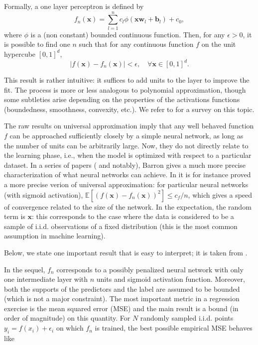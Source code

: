 \documentclass[]{krantz}
\theoremstyle{definition}
\theoremstyle{definition}
\theoremstyle{definition}
\theoremstyle{remark}
\begin{document}
Formally, a one layer perceptron is defined by
\[f_n(\textbf{x})=\sum_{l=1}^nc_l\phi(\textbf{x}\textbf{w}_l+\textbf{b}_l)+c_0,\]
where \(\phi\) is a (non constant) bounded continuous function. Then,
for any \(\epsilon>0\), it is possible to find one \(n\) such that for
any continuous function \(f\) on the unit hypercube \([0,1]^d\),
\[|f(\textbf{x})-f_n(\textbf{x})|< \epsilon, \quad \forall \textbf{x} \in [0,1]^d.\]

This result is rather intuitive: it suffices to add units to the layer
to improve the fit. The process is more or less analogous to polynomial
approximation, though some subtleties arise depending on the properties
of the activations functions (boundedness, smoothness, convexity, etc.).
We refer to \citet{costarelli2016survey} for a survey on this topic.

The raw results on universal approximation imply that any well behaved
function \(f\) can be approached sufficiently closely by a simple neural
network, as long as the number of units can be arbitrarily large. Now,
they do not directly relate to the learning phase, i.e., when the model
is optimized with respect to a particular dataset. In a series of papers
(\citet{barron1993universal} and \citet{barron1994approximation}
notably), Barron gives a much more precise characterization of what
neural networks can achieve. In \citet{barron1993universal} it is for
instance proved a more precise verion of universal approximation: for
particular neural networks (with sigmoid activation),
\(\mathbb{E}[(f(\textbf{x})-f_n(\textbf{x}))^2]\le c_f/n\), which gives
a speed of convergence related to the size of the network. In the
expectation, the random term is \(\textbf{x}\): this corresponds to the
case where the data is considered to be a sample of i.i.d. observations
of a fixed distribution (this is the most common assumption in machine
learning).

Below, we state one important result that is easy to interpret; it is
taken from \citet{barron1994approximation}.

In the sequel, \(f_n\) corresponds to a possibly penalized neural
network with only one intermediate layer with \(n\) units and sigmoid
activation function. Moreover, both the supports of the predictors and
the label are assumed to be bounded (which is not a major constraint).
The most important metric in a regression exercise is the mean squared
error (MSE) and the main result is a bound (in order of magnitude) on
this quantity. For \(N\) randomly sampled i.i.d. points
\(y_i=f(x_i)+\epsilon_i\) on which \(f_n\) is trained, the best possible
empirical MSE behaves like
\end{document}
